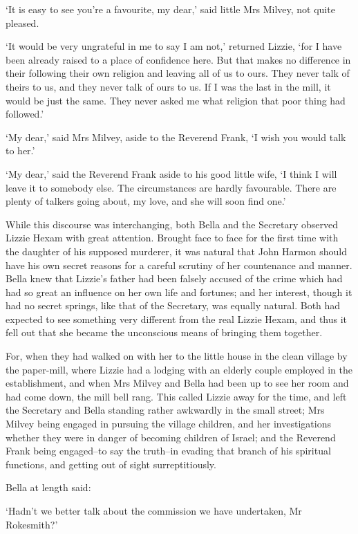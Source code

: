 ‘It is easy to see you’re a favourite, my dear,’ said little Mrs Milvey,
not quite pleased.

‘It would be very ungrateful in me to say I am not,’ returned Lizzie,
‘for I have been already raised to a place of confidence here. But that
makes no difference in their following their own religion and leaving
all of us to ours. They never talk of theirs to us, and they never talk
of ours to us. If I was the last in the mill, it would be just the same.
They never asked me what religion that poor thing had followed.’

‘My dear,’ said Mrs Milvey, aside to the Reverend Frank, ‘I wish you
would talk to her.’

‘My dear,’ said the Reverend Frank aside to his good little wife, ‘I
think I will leave it to somebody else. The circumstances are hardly
favourable. There are plenty of talkers going about, my love, and she
will soon find one.’

While this discourse was interchanging, both Bella and the Secretary
observed Lizzie Hexam with great attention. Brought face to face for the
first time with the daughter of his supposed murderer, it was natural
that John Harmon should have his own secret reasons for a careful
scrutiny of her countenance and manner. Bella knew that Lizzie’s
father had been falsely accused of the crime which had had so great an
influence on her own life and fortunes; and her interest, though it had
no secret springs, like that of the Secretary, was equally natural. Both
had expected to see something very different from the real Lizzie Hexam,
and thus it fell out that she became the unconscious means of bringing
them together.

For, when they had walked on with her to the little house in the clean
village by the paper-mill, where Lizzie had a lodging with an elderly
couple employed in the establishment, and when Mrs Milvey and Bella
had been up to see her room and had come down, the mill bell rang.
This called Lizzie away for the time, and left the Secretary and Bella
standing rather awkwardly in the small street; Mrs Milvey being engaged
in pursuing the village children, and her investigations whether they
were in danger of becoming children of Israel; and the Reverend Frank
being engaged--to say the truth--in evading that branch of his spiritual
functions, and getting out of sight surreptitiously.

Bella at length said:

‘Hadn’t we better talk about the commission we have undertaken, Mr
Rokesmith?’

